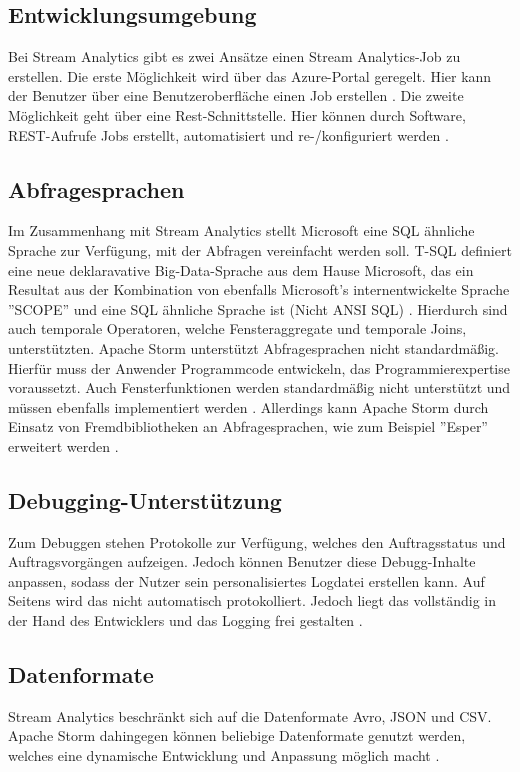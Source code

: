 \subsection{Entwicklungsumgebung}
Bei Stream Analytics gibt es zwei Ansätze einen Stream Analytics-Job zu erstellen. Die erste Möglichkeit wird über das Azure-Portal geregelt. Hier kann der Benutzer über eine Benutzeroberfläche einen Job erstellen \cite{jeffstokes72.19.12.2017}. Die zweite Möglichkeit geht über eine Rest-Schnittstelle. Hier können durch Software, REST-Aufrufe Jobs erstellt, automatisiert und re-/konfiguriert werden \cite{samacha.19.12.2017}. 

\subsection{Abfragesprachen} \label{absprache}
Im Zusammenhang mit Stream Analytics stellt Microsoft eine SQL ähnliche Sprache zur Verfügung, mit der Abfragen vereinfacht werden soll. T-SQL definiert eine neue deklaravative Big-Data-Sprache aus dem Hause Microsoft, das ein Resultat aus der Kombination von ebenfalls Microsoft’s internentwickelte Sprache ''SCOPE'' und eine SQL ähnliche Sprache ist (Nicht ANSI SQL) \cite{sql.2016}. Hierdurch sind auch temporale Operatoren, welche Fensteraggregate und temporale Joins, unterstützten. Apache Storm unterstützt Abfragesprachen nicht standardmäßig. Hierfür muss der Anwender Programmcode entwickeln, das Programmierexpertise voraussetzt. Auch Fensterfunktionen werden standardmäßig nicht unterstützt und müssen ebenfalls implementiert werden \cite{samacha.2017}. Allerdings kann Apache Storm durch Einsatz von Fremdbibliotheken an Abfragesprachen, wie zum Beispiel ''Esper'' erweitert werden \cite{esper.2016}.

\subsection{Debugging-Unterstützung} \label{Debugging}
Zum Debuggen stehen Protokolle zur Verfügung, welches den Auftragsstatus und Auftragsvorgängen aufzeigen. Jedoch können Benutzer diese Debugg-Inhalte anpassen, sodass der Nutzer sein personalisiertes Logdatei erstellen kann. Auf Seitens wird das nicht automatisch protokolliert. Jedoch liegt das vollständig in der Hand des Entwicklers und das Logging frei gestalten \cite{apachedebugging.2106}.

\subsection{Datenformate}
Stream Analytics beschränkt sich auf die Datenformate Avro, JSON und CSV. Apache Storm dahingegen können beliebige Datenformate genutzt werden, welches eine dynamische Entwicklung und Anpassung möglich macht \cite{Klein.2017}. 


